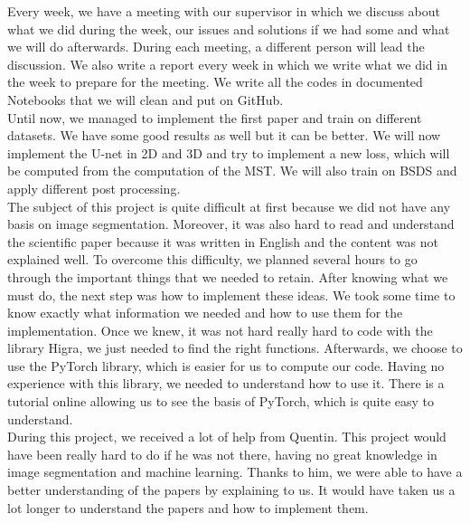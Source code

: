 \documentclass{article}
\begin{document}
Every week, we have a meeting with our supervisor in which we discuss about what we did during the week, our issues and solutions if we had some and what we will do afterwards. During each meeting, a different person will lead the discussion. We also write a report every week in which we write what we did in the week to prepare for the meeting. We write all the codes in documented Notebooks that we will clean and put on GitHub. \\

Until now, we managed to implement the first paper and train on different datasets. We have some good results as well but it can be better. We will now implement the U-net in 2D and 3D and try to implement a new loss, which will be computed from the computation of the MST. We will also train on BSDS and apply different post processing. \\

The subject of this project is quite difficult at first because we did not have any basis on image segmentation. Moreover, it was also hard to read and understand the scientific paper because it was written in English and the content was not explained well. To overcome this difficulty, we planned several hours to go through the important things that we needed to retain. After knowing what we must do, the next step was how to implement these ideas. We took some time to know exactly what information we needed and how to use them for the implementation. Once we knew, it was not hard really hard to code with the library Higra, we just needed to find the right functions. Afterwards, we choose to use the PyTorch library, which is easier for us to compute our code. Having no experience with this library, we needed to understand how to use it. There is a tutorial online allowing us to see the basis of PyTorch, which is quite easy to understand. \\

During this project, we received a lot of help from Quentin. This project would have been really hard to do if he was not there, having no great knowledge in image segmentation and machine learning. Thanks to him, we were able to have a better understanding of the papers by explaining to us. It would have taken us a lot longer to understand the papers and how to implement them. \\
\end{document}
